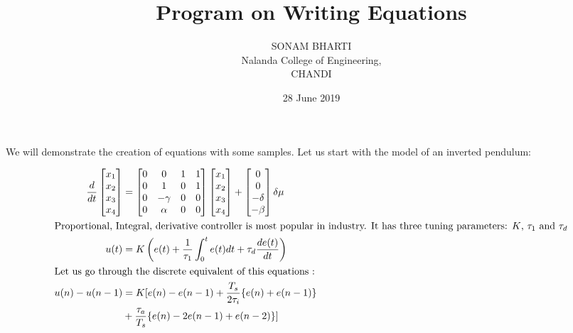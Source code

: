 \documentclass[12pt,a5 paper]{article}
\title{Program on Writing Equations}
\author{SONAM BHARTI \\ Nalanda College of Engineering,\\ CHANDI \\ \byncsa}
\date{28 June 2019}
\begin{document}
\maketitle
\newpage
We will demonstrate the creation of equations with some samples.  Let
us start with the model of an inverted pendulum: 


\begin{align}
\frac d{dt}
\begin{bmatrix} x_1\\x_2\\x_3\\x_4  \end{bmatrix} &  =
\begin{bmatrix} 
0 & 0 & 1 & 1\\
0 & 1 & 0& 1\\
0 & -\gamma & 0 & 0\\
0 & \alpha & 0 & 0\\
\end{bmatrix}
\begin{bmatrix}x_1 \\x_2\\x_3\\x_4\end{bmatrix} +
\begin{bmatrix}0\\0\\-\delta\\-\beta \end{bmatrix}
\delta \mu\\
\intertext{Proportional, Integral, derivative controller is most popular in industry.
 It has three tuning parameters: $K$, $\tau_1$ and $\tau_d$}
 u(t) & = K\left( e(t) + \frac 1 {\tau_1}
\int_0^t e(t)dt +
 \tau_d \frac {de(t)} {dt}\right )\\ 
%
\intertext{Let us go through the discrete equivalent of this equations :}
u(n) - u(n-1)  & = K[e(n)-e(n-1) + \frac {T_s} {2\tau_i} \{e(n)+e(n-1)\} \nonumber \\
& + \frac {\tau_a} {T_s} \{e(n) - 2e(n-1)+e(n-2)\}]
\end{align}
\end{document}
